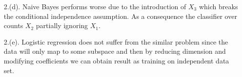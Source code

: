 \documentclass[12pt]{article}
\begin{document}
\begin{itemize}



\item[2.(d).] \smallskip Naive Bayes performs worse due to the introduction of $X_3$ which breaks the conditional independence assumption. As a consequence the    classifier over counts $X_2$ partially ignoring $X_1$.

\end{itemize}

\begin{itemize}



\item[2.(e).] \smallskip Logistic regression does not suffer from the similar problem since the data will only map to some subspace and then by reducing dimension and modifying coefficients we can obtain result as training on independent data set.

\end{itemize}
\end{document}
